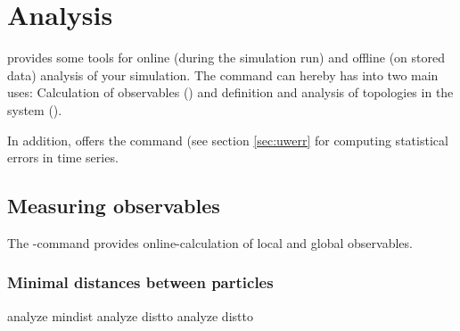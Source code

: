 %  
%   
%  
%  
%
\chapter{Analysis}
\label{chap:analysis}

\es provides some tools for online (during the simulation run) and
offline (on stored data) analysis of your simulation. The
 command can hereby has into two main uses:
Calculation of observables () and
definition and analysis of topologies in the system ().

In addition, \es offers the command  (see section
\ref{sec:uwerr} for computing statistical errors in time series.

\section{Measuring observables}

The -command provides online-calculation of local and
global observables.

\subsection{Minimal distances between particles}
\label{analyze:mindist}
\label{analyze:distto}

\begin{essyntax}
   analyze mindist 
   analyze distto 
   analyze distto   
\end{essyntax}

